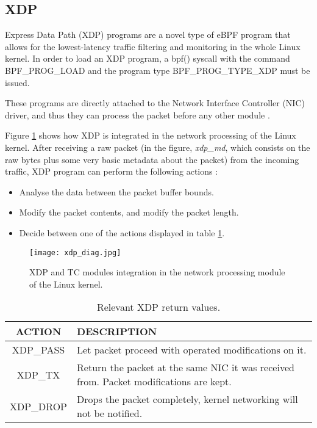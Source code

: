 \subsection{XDP} \label{subsection:xdp}
Express Data Path (XDP) programs are a novel type of eBPF program that allows for the lowest-latency traffic filtering and monitoring in the whole Linux kernel. In order to load an XDP program, a bpf() syscall with the command BPF\_PROG\_LOAD and the program type BPF\_PROG\_TYPE\_XDP must be issued. 

These programs are directly attached to the Network Interface Controller (NIC) driver, and thus they can process the packet before any other module \cite{xdp_gentle_intro}.

Figure \ref{fig:xdp_diag} shows how XDP is integrated in the network processing of the Linux kernel. After receiving a raw packet (in the figure, \textit{xdp\_md}, which consists on the raw bytes plus some very basic metadata about the packet) from the incoming traffic, XDP program can perform the following actions \cite{xdp_manual}:
\begin{itemize}
\item Analyse the data between the packet buffer bounds.
\item Modify the packet contents, and modify the packet length.
\item Decide between one of the actions displayed in table \ref{table:xdp_actions_av}.
\end{itemize}

\begin{figure}[htbp]
	\centering
	\texttt{[image: xdp\_diag.jpg]}
	\caption{XDP and TC modules integration in the network processing module of the Linux kernel.}
	\label{fig:xdp_diag}
\end{figure}

\begin{table}[htbp]
\begin{tabular}{|c|>{\centering\arraybackslash}p{10cm}|}
\hline
\textbf{ACTION} & \textbf{DESCRIPTION}\\
\hline
\hline
XDP\_PASS & Let packet proceed with operated modifications on it.\\
\hline
XDP\_TX & Return the packet at the same NIC it was received from. Packet modifications are kept.\\
\hline
XDP\_DROP & Drops the packet completely, kernel networking will not be notified.\\
\hline
\end{tabular}
\caption{Relevant XDP return values.}
\label{table:xdp_actions_av}
\end{table}

